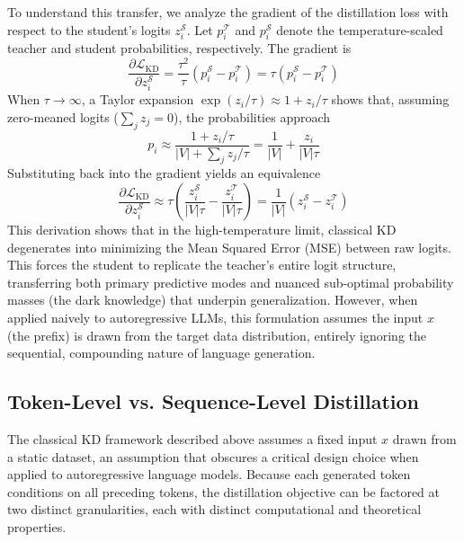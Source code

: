 \documentclass{article} %
\newcommand{\loss}{\mathcal{L}}
\begin{document}
To understand this transfer, we analyze the gradient of the distillation loss with respect to the student's logits $z_i^{\mathcal{S}}$. Let $p_i^{\mathcal{T}}$ and $p_i^{\mathcal{S}}$ denote the temperature-scaled teacher and student probabilities, respectively. The gradient is
\begin{equation}
    \frac{\partial \loss_{\mathrm{KD}}}{\partial z_i^{\mathcal{S}}} = \frac{\tau^2}{\tau} (p_i^{\mathcal{S}} - p_i^{\mathcal{T}}) = \tau (p_i^{\mathcal{S}} - p_i^{\mathcal{T}})
\end{equation}
When $\tau \to \infty$, a Taylor expansion $\exp(z_i/\tau) \approx 1 + z_i/\tau$ shows that, assuming zero-meaned logits ($\sum_j z_j = 0$), the probabilities approach
\begin{equation}
    p_i \approx \frac{1 + z_i/\tau}{|V| + \sum_j z_j/\tau} = \frac{1}{|V|} + \frac{z_i}{|V|\tau}
\end{equation}
Substituting back into the gradient yields an equivalence
\begin{equation}
    \frac{\partial \loss_{\mathrm{KD}}}{\partial z_i^{\mathcal{S}}} \approx \tau \left( \frac{z_i^{\mathcal{S}}}{|V|\tau} - \frac{z_i^{\mathcal{T}}}{|V|\tau} \right) = \frac{1}{|V|} (z_i^{\mathcal{S}} - z_i^{\mathcal{T}})
\end{equation}
This derivation shows that in the high-temperature limit, classical KD degenerates into minimizing the Mean Squared Error (MSE) between raw logits. This forces the student to replicate the teacher's entire logit structure, transferring both primary predictive modes and nuanced sub-optimal probability masses (the dark knowledge) that underpin generalization. However, when applied naively to autoregressive LLMs, this formulation assumes the input $x$ (the prefix) is drawn from the target data distribution, entirely ignoring the sequential, compounding nature of language generation.

\subsection{Token-Level vs. Sequence-Level Distillation}
\label{subsec:token_vs_sequence}

The classical KD framework described above assumes a fixed input $x$ drawn from a static dataset, an assumption that obscures a critical design choice when applied to autoregressive language models. Because each generated token conditions on all preceding tokens, the distillation objective can be factored at two distinct granularities, each with distinct computational and theoretical properties.
\end{document}
